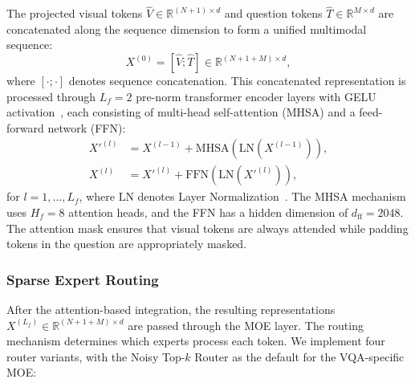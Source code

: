 The projected visual tokens $\hat{V} \in \mathbb{R}^{(N+1) \times d}$ and question tokens $\hat{T} \in \mathbb{R}^{M \times d}$ are concatenated along the sequence dimension to form a unified multimodal sequence:
\begin{equation}
    X^{(0)} = [\hat{V}; \hat{T}] \in \mathbb{R}^{(N+1+M) \times d},
    \label{eq:concat_features}
\end{equation}
where $[\cdot;\cdot]$ denotes sequence concatenation. This concatenated representation is processed through $L_f = 2$ pre-norm transformer encoder layers with GELU activation~\cite{hendrycks2016gaussian}, each consisting of multi-head self-attention (MHSA) and a feed-forward network (FFN):
\begin{align}
    X'^{(l)} &= X^{(l-1)} + \text{MHSA}\!\left(\text{LN}(X^{(l-1)})\right), \\
    X^{(l)}  &= X'^{(l)} + \text{FFN}\!\left(\text{LN}(X'^{(l)})\right),
\end{align}
for $l = 1, \ldots, L_f$, where $\text{LN}$ denotes Layer Normalization~\cite{ba2016layer}. The MHSA mechanism uses $H_f = 8$ attention heads, and the FFN has a hidden dimension of $d_{\text{ff}} = 2048$. The attention mask ensures that visual tokens are always attended while padding tokens in the question are appropriately masked.

\subsubsection{Sparse Expert Routing}
\label{sec:method:fusion:routing}

After the attention-based integration, the resulting representations $X^{(L_f)} \in \mathbb{R}^{(N+1+M) \times d}$ are passed through the MOE layer. The routing mechanism determines which experts process each token. We implement four router variants, with the Noisy Top-$k$ Router as the default for the VQA-specific MOE:

